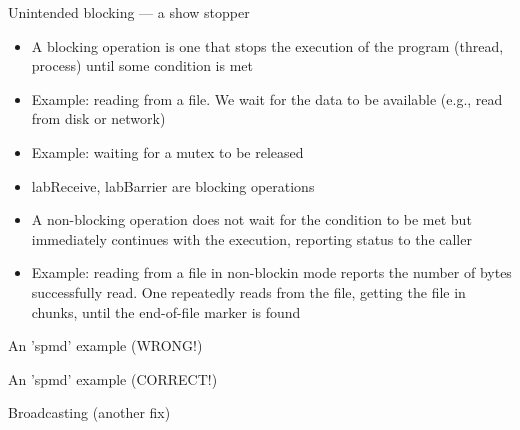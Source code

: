 \documentclass[pdflatex,colorlinks,landscape]{beamer}
\renewcommand\emph[1]{{\color{magenta}#1}}
\begin{document}
\begin{frame}{Unintended blocking --- a show stopper}
  \begin{itemize}
  \item A \emph{blocking operation} is one that stops
    the execution of the program (thread, process)
    until some condition is met
  \item Example: reading from a file. We wait for the
    data to be available (e.g., read from disk or network)
  \item Example: waiting for a mutex to be released
  \item \emph{labReceive, labBarrier} are blocking operations
  \item A \emph{non-blocking operation} does not wait for the
    condition to be met but immediately continues with the
    execution, reporting status to the caller
  \item Example: reading from a file in non-blockin mode reports the number
    of bytes successfully read. One repeatedly reads
    from the file, getting the file in chunks, until the end-of-file marker
    is found
  \end{itemize}
\end{frame}

\begin{frame}[allowframebreaks]{An 'spmd' example (WRONG!)}
  \begin{small}
    
  \end{small}
  \begin{tiny}
  \end{tiny}
\end{frame}

\begin{frame}[allowframebreaks]{An 'spmd' example (CORRECT!)}
  \begin{small}
    
  \end{small}
  \begin{tiny}
  \end{tiny}
\end{frame}

\begin{frame}[allowframebreaks]{Broadcasting (another fix)}
  \begin{small}
    
  \end{small}
  \begin{tiny}
  \end{tiny}
\end{frame}
\end{document}
